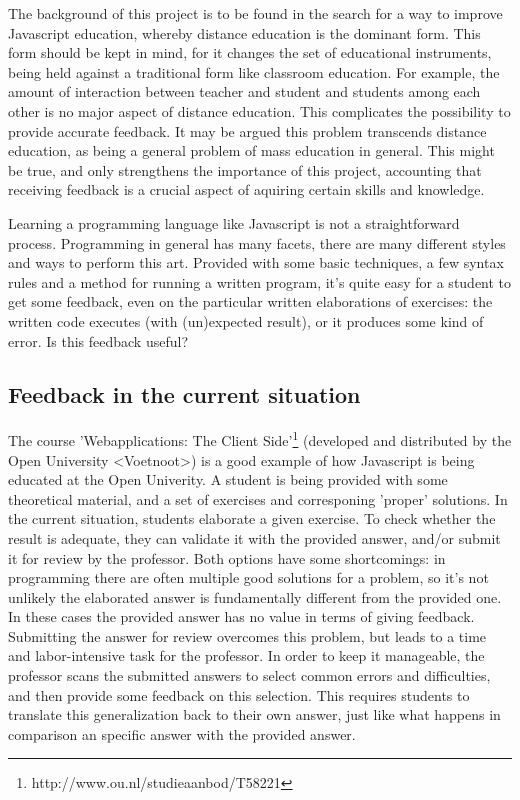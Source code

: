 \documentclass{article}
\begin{document}
The background of this project is to be found in the search for a way to improve Javascript education, whereby distance education is the dominant form. This form should be kept in mind, for it changes the set of educational instruments, being held against a traditional form like classroom education. For example, the amount of interaction between teacher and student and students among each other is no major aspect of distance education. This complicates the possibility to provide accurate feedback. It may be argued this problem transcends distance education, as being a general problem of mass education in general. This might be true, and only strengthens the importance of this project, accounting that receiving feedback is a crucial aspect of aquiring certain skills and knowledge. 

Learning a programming language like Javascript is not a straightforward process. Programming in general has many facets, there are many different styles and ways to perform this art. Provided with some basic techniques, a few syntax rules and a method for running a written program, it's quite easy for a student to get some feedback, even on the particular written elaborations of exercises: the written code executes (with (un)expected result), or it produces some kind of error. Is this feedback useful? 

\subsection{Feedback in the current situation}

The course 'Webapplications: The Client Side'\footnote{http://www.ou.nl/studieaanbod/T58221} (developed and distributed by the Open University <Voetnoot>) is a good example of how Javascript is being educated at the Open Univerity. A student is being provided with some theoretical material, and a set of exercises and corresponing 'proper' solutions. In the current situation, students elaborate a given exercise. To check whether the result is adequate, they can validate it with the provided answer, and/or submit it for review by the professor. Both options have some shortcomings: in programming there are often multiple good solutions for a problem, so it’s not unlikely the elaborated answer is fundamentally different from the provided one. In these cases the provided answer has no value in terms of giving feedback. Submitting the answer for review overcomes this problem, but leads to a time and labor-intensive task for the professor. In order to keep it manageable, the professor scans the submitted answers to select common errors and difficulties, and then provide some feedback on this selection. This requires students to translate this generalization back to their own answer, just like what happens in comparison an specific answer with the provided answer.
\end{document}
